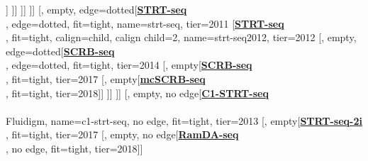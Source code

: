 \documentclass[12pt, a4]{article}
\begin{document}
\begin{center}
\begin{forest}
	[\href{https://www.nature.com/articles/nmeth.1315}{\textbf{mRNA-seq}}\\\citealt{tang2009}, edge=dotted, calign=child, calign child=3, fit=tight, name=mrna-seq, tier=2009
		[, empty, edge=dotted, tier=2011[\href{https://www.pnas.org/content/111/19/7048.long}{\textbf{Microfluidic}}\\\href{https://www.pnas.org/content/111/19/7048.long}
		{\textbf{mRNA-seq}}\\\citealt{streets2014}, edge=dotted, fit=tight, tier=2014
			[, empty, no edge[\textbf{Chromium}\\10x Genomics 2016, no edge, fit=tight, name=chromium2016, tier=2016
				[, empty[\textbf{\href{https://www.nature.com/articles/ncomms14049}{Chromium}}\\\citealt{zheng2017}\\10x Genomics, fit=tight, name=chromium2017, tier=2017
					[, empty, edge=dotted[\href{https://www.nature.com/articles/s41467-019-11049-4}{\textbf{RAGE-seq}}\\\citealt{singh2019}, edge=dotted, fit=tight, name=rage-seq, tier=2019]]
				]]
			]]
		]]
		[, empty, edge=dotted[\href{https://genome.cshlp.org/content/21/7/1160.long}{\textbf{STRT-seq}}\\\citealt{islam2011}, edge=dotted, fit=tight, name=strt-seq, tier=2011
			[\href{https://www.nature.com/articles/nprot.2012.022}{\textbf{STRT-seq}}\\\citealt{islam2012}, fit=tight, calign=child, calign child=2, name=strt-seq2012, tier=2012
				[, empty, edge=dotted[\href{https://www.biorxiv.org/content/10.1101/003236v1}{\textbf{SCRB-seq}}\\\citealt{soumillon2014}, edge=dotted, fit=tight, tier=2014
					[, empty[\href{https://www.sciencedirect.com/science/article/pii/S1097276517300497}{\textbf{SCRB-seq}}\\\citealt{ziegenhain2017}, fit=tight, tier=2017
						[, empty[\href{https://www.nature.com/articles/s41467-018-05347-6}{\textbf{mcSCRB-seq}}\\\citealt{bagnoli2018}, fit=tight, tier=2018]]
					]]
				]]
				[, empty, no edge[\href{https://doi.org/10.1038/nmeth.2772}{\textbf{C1-STRT-seq}}\\\citealt{islam2013}\\Fluidigm, name=c1-strt-seq, no edge, fit=tight, tier=2013
					[, empty[\href{https://www.nature.com/articles/s41598-017-16546-4}{\textbf{STRT-seq-2i}}\\\citealt{hochgerner2017}, fit=tight, tier=2017
						[, empty, no edge[\href{https://doi.org/10.1038/s41467-018-02866-0}{\textbf{RamDA-seq}}\\\citealt{hayashi2018}, no edge, fit=tight, tier=2018]]

\end{forest}
\end{center}
\end{document}
